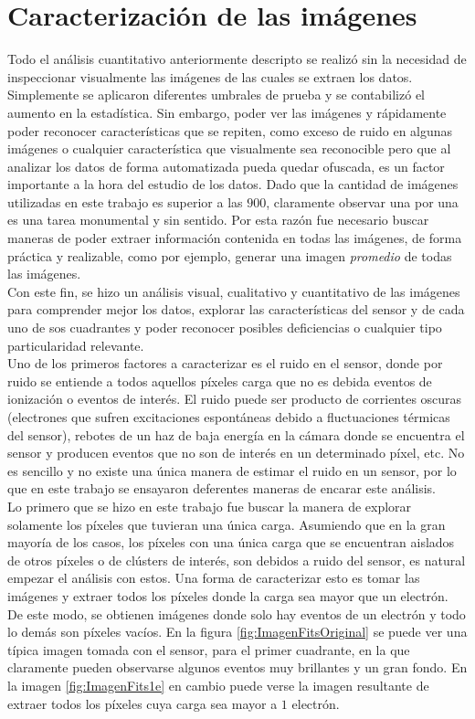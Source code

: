 \section{Caracterización de las imágenes}
\noindent Todo el análisis cuantitativo anteriormente descripto se realizó sin la necesidad de inspeccionar visualmente las imágenes de las cuales se extraen los datos. Simplemente se aplicaron diferentes umbrales de prueba y se contabilizó el aumento en la estadística. Sin embargo, poder ver las imágenes y rápidamente poder reconocer características que se repiten, como exceso de ruido en algunas imágenes o cualquier característica que visualmente sea reconocible pero que al analizar los datos de forma automatizada pueda quedar ofuscada, es un factor importante a la hora del estudio de los datos. Dado que la cantidad de imágenes utilizadas en este trabajo es superior a las $900$, claramente observar una por una es una tarea monumental y sin sentido. Por esta razón fue necesario buscar maneras de poder extraer información contenida en todas las imágenes, de forma práctica y realizable, como por ejemplo, generar una imagen \textit{promedio} de todas las imágenes.\\
\indent Con este fin, se hizo un análisis visual, cualitativo y cuantitativo de las imágenes para comprender mejor los datos, explorar las características del sensor y de cada uno de sos cuadrantes y poder reconocer posibles deficiencias o cualquier tipo particularidad relevante.\\
\indent Uno de los primeros factores a caracterizar es el ruido en el sensor, donde por ruido se entiende a todos aquellos píxeles carga que no es debida eventos de ionización o eventos de interés. El ruido puede ser producto de corrientes oscuras (electrones que sufren excitaciones espontáneas debido a fluctuaciones térmicas del sensor), rebotes de un haz de baja energía en la cámara donde se encuentra el sensor y producen eventos que no son de interés en un determinado píxel, etc. No es sencillo y no existe una única manera de estimar el ruido en un sensor, por lo que en este trabajo se ensayaron deferentes maneras de encarar este análisis. \\
\indent Lo primero que se hizo en este trabajo fue buscar la manera de explorar solamente los píxeles que tuvieran una única carga. Asumiendo que en la gran mayoría de los casos, los píxeles con una única carga que se encuentran aislados de otros píxeles o de clústers de interés, son debidos a ruido del sensor, es natural empezar el análisis con estos. Una forma de caracterizar esto es tomar las imágenes y extraer todos los píxeles donde la carga sea mayor que un electrón. De este modo, se obtienen imágenes donde solo hay eventos de un electrón y todo lo demás son píxeles vacíos. En la figura \ref{fig:ImagenFitsOriginal} se puede ver una típica imagen tomada con el sensor, para el primer cuadrante, en la que claramente pueden observarse algunos eventos muy brillantes y un gran fondo. En la imagen \ref{fig:ImagenFits1e} en cambio puede verse la imagen resultante de extraer todos los píxeles cuya carga sea mayor a $1$ electrón.
